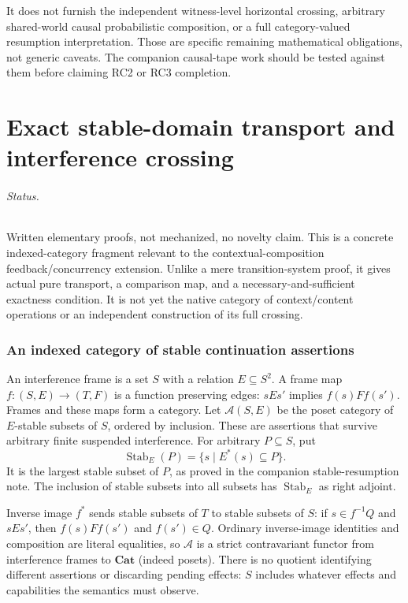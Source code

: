\documentclass[11pt]{article}
\newcommand{\Stab}{\operatorname{Stab}}
\begin{document}
It does not furnish the independent witness-level horizontal crossing, arbitrary shared-world causal probabilistic composition, or a full category-valued resumption interpretation. Those are specific remaining mathematical obligations, not generic caveats. The companion causal-tape work should be tested against them before claiming RC2 or RC3 completion.


\part{Exact stable-domain transport and interference crossing}

\paragraph{Status.} Written elementary proofs, not mechanized, no novelty claim. This is a concrete indexed-category fragment relevant to the contextual-composition feedback/concurrency extension. Unlike a mere transition-system proof, it gives actual pure transport, a comparison map, and a necessary-and-sufficient exactness condition. It is not yet the native category of context/content operations or an independent construction of its full crossing.

\section{An indexed category of stable continuation assertions}
An interference frame is a set $S$ with a relation $E\subseteq S^2$. A frame map $f:(S,E)\to(T,F)$ is a function preserving edges: $sEs'$ implies $f(s)Ff(s')$. Frames and these maps form a category. Let $\mathcal A(S,E)$ be the poset category of $E$-stable subsets of $S$, ordered by inclusion. These are assertions that survive arbitrary finite suspended interference. For arbitrary $P\subseteq S$, put
\[
\Stab_E(P)=\{s\mid E^*(s)\subseteq P\}.
\]
It is the largest stable subset of $P$, as proved in the companion stable-resumption note. The inclusion of stable subsets into all subsets has $\Stab_E$ as right adjoint.

Inverse image $f^*$ sends stable subsets of $T$ to stable subsets of $S$: if $s\in f^{-1}Q$ and $sEs'$, then $f(s)Ff(s')$ and $f(s')\in Q$. Ordinary inverse-image identities and composition are literal equalities, so $\mathcal A$ is a strict contravariant functor from interference frames to $\mathbf{Cat}$ (indeed posets). There is no quotient identifying different assertions or discarding pending effects: $S$ includes whatever effects and capabilities the semantics must observe.
\end{document}
